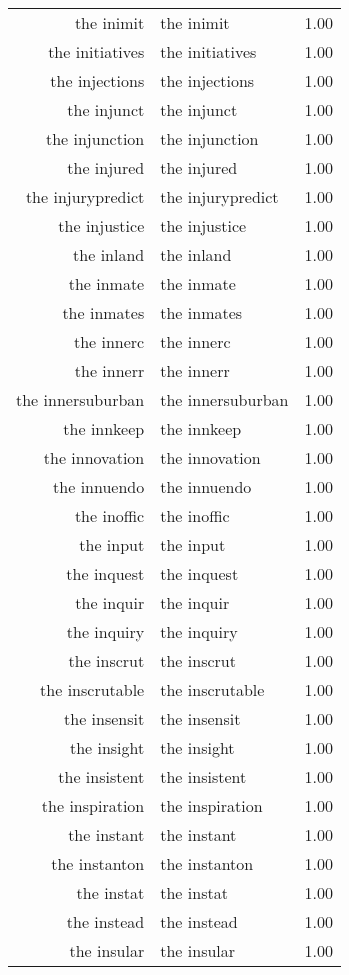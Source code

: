 \begin{table}[ht]
\begin{tabular}{rlr}
  the inimit & the inimit & 1.00 \\ 
  the initiatives & the initiatives & 1.00 \\ 
  the injections & the injections & 1.00 \\ 
  the injunct & the injunct & 1.00 \\ 
  the injunction & the injunction & 1.00 \\ 
  the injured & the injured & 1.00 \\ 
  the injurypredict & the injurypredict & 1.00 \\ 
  the injustice & the injustice & 1.00 \\ 
  the inland & the inland & 1.00 \\ 
  the inmate & the inmate & 1.00 \\ 
  the inmates & the inmates & 1.00 \\ 
  the innerc & the innerc & 1.00 \\ 
  the innerr & the innerr & 1.00 \\ 
  the innersuburban & the innersuburban & 1.00 \\ 
  the innkeep & the innkeep & 1.00 \\ 
  the innovation & the innovation & 1.00 \\ 
  the innuendo & the innuendo & 1.00 \\ 
  the inoffic & the inoffic & 1.00 \\ 
  the input & the input & 1.00 \\ 
  the inquest & the inquest & 1.00 \\ 
  the inquir & the inquir & 1.00 \\ 
  the inquiry & the inquiry & 1.00 \\ 
  the inscrut & the inscrut & 1.00 \\ 
  the inscrutable & the inscrutable & 1.00 \\ 
  the insensit & the insensit & 1.00 \\ 
  the insight & the insight & 1.00 \\ 
  the insistent & the insistent & 1.00 \\ 
  the inspiration & the inspiration & 1.00 \\ 
  the instant & the instant & 1.00 \\ 
  the instanton & the instanton & 1.00 \\ 
  the instat & the instat & 1.00 \\ 
  the instead & the instead & 1.00 \\ 
  the insular & the insular & 1.00 \\ 

\end{tabular}
\end{table}
